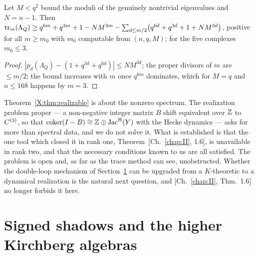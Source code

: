 \begin{lemma}\label{X:lem:bound}
Let $M<q^{2}$ bound the moduli of the genuinely nontrivial eigenvalues and $N=n-1$. Then
$\operatorname{tr}_m(\Lambda_Q)\ge q^{6m}+q^{3m}+1-NM^{3m}-\sum_{d\le m/2}\bigl(q^{6d}+q^{3d}+1+NM^{3d}\bigr)$,
positive for all $m\ge m_0$ with $m_0$ computable from $(n,q,M)$; for the five complexes
$m_0\le3$.
\end{lemma}

\begin{proof}
$|p_d(\Lambda_Q)-(1+q^{3d}+q^{6d})|\le NM^{3d}$; the proper divisors of $m$ are $\le m/2$; the
bound increases with $m$ once $q^{6m}$ dominates, which for $M=q$ and $n\le168$ happens by
$m=3$.
\end{proof}

\begin{remark}\label{X:rem:realization}
Theorem~\ref{X:thm:realizable} is about the nonzero spectrum. The realization problem proper
--- a non-negative integer matrix $B$ shift equivalent over $\mathbb{Z}$ to $C^{(3)}$, so that
$\operatorname{coker}(I-B)\cong\mathbb{Z}\oplus\operatorname{Jac}^{\mathrm{H}}(Y)$ with the Hecke dynamics --- asks for more than spectral
data, and we do not solve it. What is established is that the one tool which closed it in
rank one, Theorem~[Ch.~\ref{chap:II}, 1.6], is unavailable in rank two, and that the necessary conditions
known to us are all satisfied. The problem is open and, as far as the trace method can see,
unobstructed. Whether the double-loop mechanism of Section~\ref{X:sec:shadow} can be upgraded
from a $K$-theoretic to a dynamical realization is the natural next question, and [Ch.~\ref{chap:II}, Thm.~1.6] no longer forbids it here.
\end{remark}

\section{Signed shadows and the higher Kirchberg algebras}\label{X:sec:shadow}


